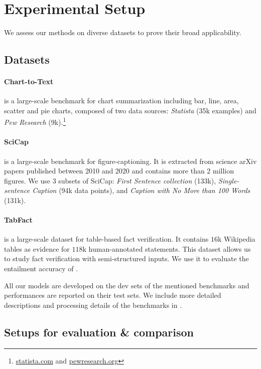 \section{Experimental Setup}
\label{sec:experiment_setup}

We assess our methods on diverse datasets to prove their broad applicability.

\subsection{Datasets}
\paragraph{Chart-to-Text~\cite{kantharaj-etal-2022-chart}} 
is a large-scale benchmark for chart summarization including bar, line, area, scatter and pie charts, composed of two data sources: \emph{Statista} (35k examples) and \emph{Pew Research} (9k).\footnote{\href{https://statista.com}{statista.com} and \href{https://pewresearch.org}{pewresearch.org}}

\paragraph{SciCap~\cite{hsu-etal-2021-scicap-generating}} is a large-scale benchmark for figure-captioning. It is extracted from science arXiv papers published between 2010 and 2020 and contains more than 2 million figures. We use 3 subsets of SciCap: \emph{First Sentence collection} (133k), \emph{Single-sentence Caption} (94k data points), and \emph{Caption with No More than 100 Words} (131k).




\paragraph{TabFact~\cite{chen2019tabfact}} is a large-scale dataset for table-based fact verification. It contains $16$k Wikipedia tables as evidence for $118$k human-annotated statements. This dataset allows us to study fact verification with semi-structured inputs. We use it to evaluate the entailment accuracy of \metric.

All our models are developed on the dev sets of the mentioned benchmarks and performances are reported on their test sets. We include more detailed descriptions and processing details of the benchmarks in .

\subsection{Setups for evaluation \& comparison}

